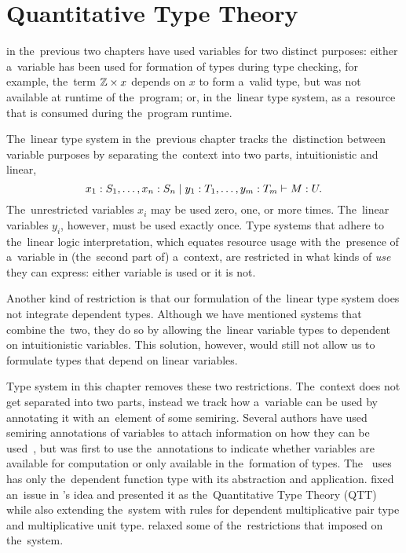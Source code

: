 \chapter{Quantitative Type Theory}\label{cha:qtt}

 in the~previous two chapters have used
variables for two distinct purposes: either a~variable has been used for
formation of types during type checking, for example, the~term $\mathbb{Z} \times x$
depends on $x$ to form a~valid type, but was not available at runtime of
the~program; or, in the~linear type system, as a~resource that is consumed
during the~program runtime.

The~linear type system in the~previous chapter tracks the~distinction between
variable purposes by separating the~context into two parts, intuitionistic and
linear,
\[
  x_1 \overset{}: S_1, \dotsc, x_n \overset{}: S_n \mid y_1 \overset{}: T_1, \dotsc, y_m \overset{}: T_m
    \vdash M \overset{}: U.
\]
The~unrestricted variables $x_i$ may be used zero, one, or more times.
The~linear variables $y_i$, however, must be used exactly once. Type systems
that adhere to the~linear logic interpretation, which equates resource usage
with the~presence of a~variable in (the~second part of) a~context, are
restricted in what kinds of \emph{use} they can express: either variable is used
or it is not.

Another kind of restriction is that our formulation of the~linear type system
does not integrate dependent types. Although we have mentioned systems that
combine the~two, they do so by allowing the~linear variable types to dependent
on intuitionistic variables. This solution, however, would still not allow us to
formulate types that depend on linear variables.

Type system in this chapter removes these two restrictions. The~context does not
get separated into two parts, instead we track how a~variable can be used by
annotating it with an~element of some semiring. Several authors have used
semiring annotations of variables to attach information on how they can be
used~\citep{brunel_et_al_2014, ghica_smith_2014}, but \citet{mcbride_2016} was
first to use the~annotations to indicate whether variables are available for
computation or only available in the~formation of types. The~\lc
\citeauthor{mcbride_2016} uses has only the~dependent function type with its
abstraction and application. \citet{atkey_2018} fixed an~issue in
\citeauthor{mcbride_2016}'s idea and presented it as the~Quantitative Type
Theory (QTT) while also extending the~system with rules for dependent
multiplicative pair type and multiplicative unit type. \citet{weirich_2020}
relaxed some of the~restrictions that \citeauthor{atkey_2018} imposed on
the~system.

